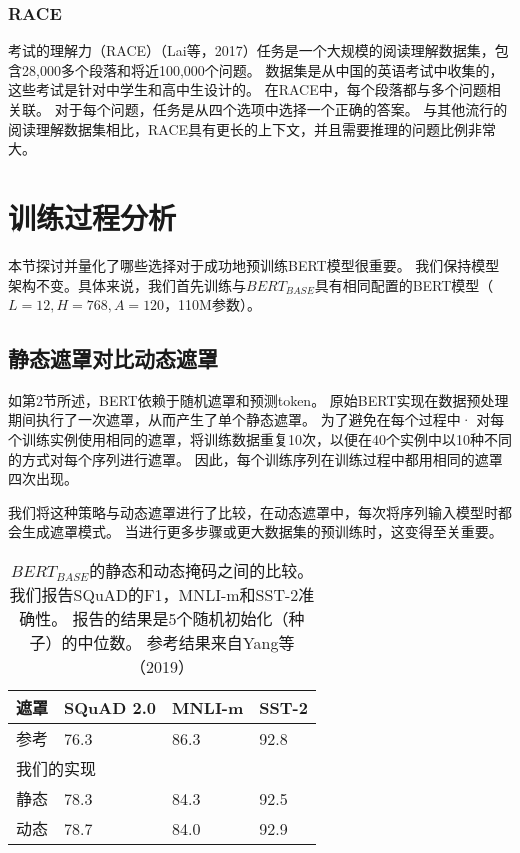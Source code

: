 \documentclass[lang=cn,11pt,a4paper,twocolumn]{elegantpaper}
\begin{document}
\subsubsection{RACE}
考试的理解力（RACE）（Lai等，2017）任务是一个大规模的阅读理解数据集，包含28,000多个段落和将近100,000个问题。 数据集是从中国的英语考试中收集的，这些考试是针对中学生和高中生设计的。 在RACE中，每个段落都与多个问题相关联。 对于每个问题，任务是从四个选项中选择一个正确的答案。 与其他流行的阅读理解数据集相比，RACE具有更长的上下文，并且需要推理的问题比例非常大。
\section{训练过程分析}
本节探讨并量化了哪些选择对于成功地预训练BERT模型很重要。 我们保持模型架构不变。具体来说，我们首先训练与$BERT_{BASE}$具有相同配置的BERT模型（$L = 12,H = 768,A = 120$，110M参数）。
\subsection{静态遮罩对比动态遮罩}
如第2节所述，BERT依赖于随机遮罩和预测token。 原始BERT实现在数据预处理期间执行了一次遮罩，从而产生了单个静态遮罩。 为了避免在每个过程中· 对每个训练实例使用相同的遮罩，将训练数据重复10次，以便在40个实例中以10种不同的方式对每个序列进行遮罩。 因此，每个训练序列在训练过程中都用相同的遮罩四次出现。

我们将这种策略与动态遮罩进行了比较，在动态遮罩中，每次将序列输入模型时都会生成遮罩模式。 当进行更多步骤或更大数据集的预训练时，这变得至关重要。

\begin{table}[]
  \centering

  \begin{tabular}{llll}
  \hline
  遮罩 & \textbf{SQuAD 2.0} & \textbf{MNLI-m} & \textbf{SST-2} \\ \hline
  参考 & 76.3               & 86.3            & 92.8           \\ \hline
  \multicolumn{4}{l}{我们的实现}                                \\ 
  静态 & 78.3               & 84.3            & 92.5           \\ 
  动态 & 78.7               & 84.0            & 92.9           \\ \hline
  \end{tabular}
  \caption{$BERT_{BASE}$的静态和动态掩码之间的比较。 我们报告SQuAD的F1，MNLI-m和SST-2准确性。 报告的结果是5个随机初始化（种子）的中位数。 参考结果来自Yang等（2019）}
  \end{table}
\end{document}
